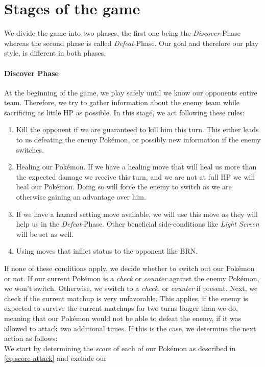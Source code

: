 \section{Stages of the game}
\label{sec:stages-of-game}
We divide the game into two phases, the first one being the \textit{Discover}-Phase whereas the second phase is called
\textit{Defeat}-Phase. Our goal and therefore our play style, is different in both phases.
\paragraph{Discover Phase}
At the beginning of the game, we play safely until we know our opponents entire team. Therefore, we try to gather 
information about the enemy team while sacrificing as little \ac{HP} as possible. In this stage, we act following
these rules:
\begin{enumerate}
	\item Kill the opponent if we are guaranteed to kill him this turn. This either leads to us defeating the 
	enemy Pokémon, or possibly new information if the enemy switches.
	\item Healing our Pokémon. If we have a healing move that will heal us more than the expected damage we receive
	this turn, and we are not at full \ac{HP} we will heal our Pokémon. Doing so will force the enemy to switch as
	we are otherwise gaining an advantage over him.
	\item If we have a hazard setting move available, we will use this move as they will help us in the \textit{Defeat}-Phase.
	Other beneficial side-conditions like \textit{Light Screen} will be set as well. 
	\item Using moves that inflict status to the opponent like \ac{BRN}.
\end{enumerate}
If none of these conditions apply, we decide whether to switch out our Pokémon or not. If our current Pokémon is a 
\textit{check} or \textit{counter} against the enemy Pokémon, we won't switch. Otherwise, we switch to a \textit{check},
or \textit{counter} if present. Next, we check if the current matchup is very unfavorable. This applies, if the enemy
is expected to survive the current matchups for two turns longer than we do, meaning that our Pokémon would not be able
to defeat the enemy, if it was allowed to attack two additional times. If this is the case, we determine the next action
as follows: \\
We start by determining the \textit{score} of each of our Pokémon as described in \ref{eq:score-attack} and exclude our
